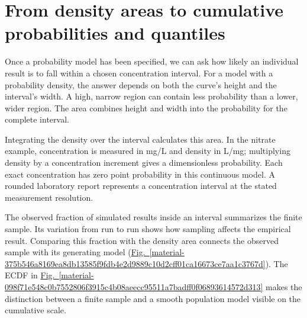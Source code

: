 \documentclass[11pt,a4paper]{article}
\begin{document}
\medskip

\clearpage
\section{From density areas to cumulative probabilities and quantiles}
Once a probability model has been specified, we can ask how likely an individual result is to fall within a chosen concentration interval. For a model with a probability density, the answer depends on both the curve's height and the interval's width. A high, narrow region can contain less probability than a lower, wider region. The area combines height and width into the probability for the complete interval.


Integrating the density over the interval calculates this area. In the nitrate example, concentration is measured in mg/L and density in L/mg; multiplying density by a concentration increment gives a dimensionless probability. Each exact concentration has zero point probability in this continuous model. A rounded laboratory report represents a concentration interval at the stated measurement resolution.


The observed fraction of simulated results inside an interval summarizes the finite sample. Its variation from run to run shows how sampling affects the empirical result. Comparing this fraction with the density area connects the observed sample with its generating model (\hyperref[material-375b546a8169ea8db13585f9fdb4e2d9889c10d2cff01ca16673ce7aa1c3767d]{Fig.~\ref*{material-375b546a8169ea8db13585f9fdb4e2d9889c10d2cff01ca16673ce7aa1c3767d}}). The ECDF in \hyperref[material-098f71e548c0b7552806f3915c4b08aeecc95511a7badff0f06893614572d313]{Fig.~\ref*{material-098f71e548c0b7552806f3915c4b08aeecc95511a7badff0f06893614572d313}} makes the distinction between a finite sample and a smooth population model visible on the cumulative scale.
\end{document}
